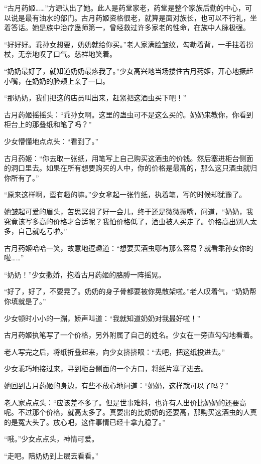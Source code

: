 \begin{this_body}
“古月药姬……”方源认出了她。此人是药堂家老，药堂是整个家族后勤的中心，可以说是最有油水的部门。古月药姬资格很老，就算是面对族长，也可以不行礼，坐着答话。她是族中治疗蛊师第一，曾经救过许多家老的性命，在族中人脉极强。

“好好好。乖孙女想要，奶奶就给你买。”老人家满脸皱纹，勾勒着背，一手拄着拐杖，无奈地叹了口气。慈祥地笑着。

“奶奶最好了，就知道奶奶最疼我了。”少女高兴地当场搂住古月药姬，开心地撅起小嘴，在奶奶的脸颊上亲了一口。

“那奶奶，我们把这的店员叫出来，赶紧把这酒虫买下吧！”

古月药姬摇摇头：“乖孙女啊。这里的蛊虫可不是这么买的。奶奶来教你，你看到柜台上的那叠纸和笔了吗？”

少女懵懂地点点头：“看到了。”

古月药姬：“你去取一张纸，用笔写上自己购买这酒虫的价钱。然后塞进柜台侧面的洞口里去。如果在所有想要购买的人中，你的价格是最高的，那么这只酒虫就归你所有了。”

“原来这样啊，蛮有趣的嘛。”少女拿起一张竹纸，执着笔，写的时候却犹豫了。

她皱起可爱的眉头，苦思冥想了好一会儿，终于还是微微撅嘴，问道，“奶奶，我究竟该写多高的价格才合适呢？我怕价格低了，酒虫被人买走了。价格高出别人太多，自己就吃亏啦。”

古月药姬哈哈一笑，故意地逗趣道：“想要买酒虫哪有那么容易？就看乖孙女你的啦……”

“奶奶！”少女撒娇，抱着古月药姬的胳膊一阵摇晃。

“好了，好了，不要晃了。奶奶的身子骨都要被你晃散架啦。”老人叹着气，“奶奶帮你填就是了。”

少女顿时小小的一蹦，娇声叫道：“我就知道奶奶对我最好啦！”

古月药姬执笔写了一个价格，另外附属了自己的姓名。少女在一旁直勾勾地看着。

老人写完之后，将纸折叠起来，向少女挤挤眼：“去吧，把这纸投进去。”

少女乖巧地接过来，寻到柜台侧面的一个方口，将纸片塞了进去。

她回到古月药姬的身边，有些不放心地问道：“奶奶，这样就可以了吗？”

老人家点点头：“应该差不多了。但是世事难料，也许有人出价比奶奶的还要高呢。不过那个价格，就高太多了。真要出的比奶奶的还要高，那购买这酒虫的人真的是冤大头了。放心吧，这件事情已经十拿九稳了。”

“哦。”少女点点头，神情可爱。

“走吧。陪奶奶到上层去看看。”


\end{this_body}
